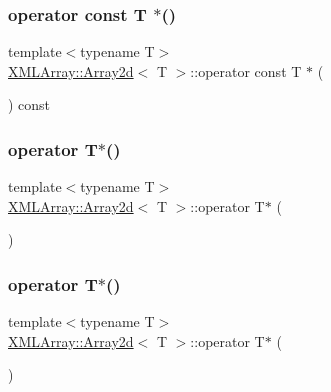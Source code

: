 \subsubsection{\texorpdfstring{operator const T $\ast$()}{operator const T *()}\hspace{0.1cm}{\footnotesize\ttfamily [3/3]}}
{\footnotesize\ttfamily template$<$typename T$>$ \\
\mbox{\hyperlink{classXMLArray_1_1Array2d}{X\+M\+L\+Array\+::\+Array2d}}$<$ T $>$\+::operator const T $\ast$ (\begin{DoxyParamCaption}{ }\end{DoxyParamCaption}) const\hspace{0.3cm}{\ttfamily [inline]}}

\mbox{\label{classXMLArray_1_1Array2d_a9d46505eb6c4149239bc87ba408c6b5b}} 
\subsubsection{\texorpdfstring{operator T$\ast$()}{operator T*()}\hspace{0.1cm}{\footnotesize\ttfamily [1/3]}}
{\footnotesize\ttfamily template$<$typename T$>$ \\
\mbox{\hyperlink{classXMLArray_1_1Array2d}{X\+M\+L\+Array\+::\+Array2d}}$<$ T $>$\+::operator T$\ast$ (\begin{DoxyParamCaption}{ }\end{DoxyParamCaption})\hspace{0.3cm}{\ttfamily [inline]}}

\mbox{\label{classXMLArray_1_1Array2d_a9d46505eb6c4149239bc87ba408c6b5b}} 
\subsubsection{\texorpdfstring{operator T$\ast$()}{operator T*()}\hspace{0.1cm}{\footnotesize\ttfamily [2/3]}}
{\footnotesize\ttfamily template$<$typename T$>$ \\
\mbox{\hyperlink{classXMLArray_1_1Array2d}{X\+M\+L\+Array\+::\+Array2d}}$<$ T $>$\+::operator T$\ast$ (\begin{DoxyParamCaption}{ }\end{DoxyParamCaption})\hspace{0.3cm}{\ttfamily [inline]}}

